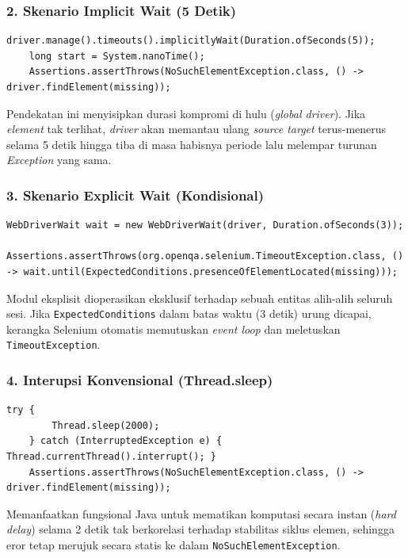 \documentclass[a4paper,oneside,12pt]{report}
\begin{document}
\subsubsection*{2. Skenario Implicit Wait (5 Detik)}
\begin{lstlisting}[style=javastyle]
    driver.manage().timeouts().implicitlyWait(Duration.ofSeconds(5));
    long start = System.nanoTime();
    Assertions.assertThrows(NoSuchElementException.class, () -> driver.findElement(missing));
\end{lstlisting}
Pendekatan ini menyisipkan durasi kompromi di hulu (\textit{global driver}). Jika \textit{element} tak terlihat, \textit{driver} akan memantau ulang \textit{source target} terus-menerus selama 5 detik hingga tiba di masa habisnya periode lalu melempar turunan \textit{Exception} yang sama.

\subsubsection*{3. Skenario Explicit Wait (Kondisional)}
\begin{lstlisting}[style=javastyle]
    WebDriverWait wait = new WebDriverWait(driver, Duration.ofSeconds(3));
    Assertions.assertThrows(org.openqa.selenium.TimeoutException.class, () -> wait.until(ExpectedConditions.presenceOfElementLocated(missing)));
\end{lstlisting}
Modul eksplisit dioperasikan eksklusif terhadap sebuah entitas alih-alih seluruh sesi. Jika \texttt{ExpectedConditions} dalam batas waktu (3 detik) urung dicapai, kerangka Selenium otomatis memutuskan \textit{event loop} dan meletuskan \texttt{TimeoutException}.

\subsubsection*{4. Interupsi Konvensional (Thread.sleep)}
\begin{lstlisting}[style=javastyle]
    try {
        Thread.sleep(2000);
    } catch (InterruptedException e) { Thread.currentThread().interrupt(); }
    Assertions.assertThrows(NoSuchElementException.class, () -> driver.findElement(missing));
\end{lstlisting}
Memanfaatkan fungsional Java untuk mematikan komputasi secara instan (\textit{hard delay}) selama 2 detik tak berkorelasi terhadap stabilitas siklus elemen, sehingga eror tetap merujuk secara statis ke dalam \texttt{NoSuchElementException}.
\end{document}
